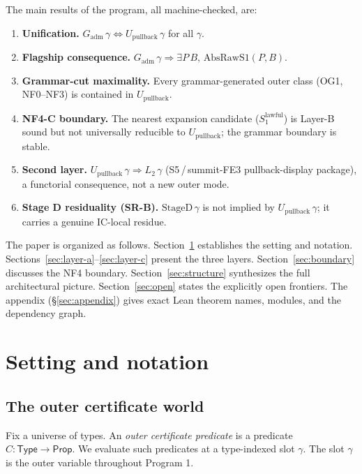 \documentclass[11pt]{article}
\theoremstyle{plain}
\theoremstyle{definition}
\newcommand{\Gadm}{G_{\mathrm{adm}}}
\newcommand{\Upb}{U_{\mathrm{pullback}}}
\newcommand{\AbsRawSone}{\mathrm{AbsRawS1}}
\newcommand{\Stwo}{L_2}
\newcommand{\StageD}{\mathrm{StageD}}
\newcommand{\SoneLawful}{S_1^{\mathrm{lawful}}}
\begin{document}
The main results of the program, all machine-checked, are:

\begin{enumerate}[label=(\Roman*)]
  \item \textbf{Unification.} $\Gadm\,\gamma \iff \Upb\,\gamma$ for all $\gamma$.
  \item \textbf{Flagship consequence.} $\Gadm\,\gamma \Rightarrow \exists P\,B,\, \AbsRawSone(P,B)$.
  \item \textbf{Grammar-cut maximality.} Every grammar-generated outer class
    (OG1, NF0--NF3) is contained in $\Upb$.
  \item \textbf{NF4-C boundary.} The nearest expansion candidate
    ($\SoneLawful$) is Layer-B sound but not universally reducible to $\Upb$;
    the grammar boundary is stable.
  \item \textbf{Second layer.} $\Upb\,\gamma \Rightarrow \Stwo\,\gamma$
    (S5\,/\,summit-FE3 pullback-display package), a functorial consequence,
    not a new outer mode.
  \item \textbf{Stage D residuality (SR-B).} $\StageD\,\gamma$ is not implied
    by $\Upb\,\gamma$; it carries a genuine IC-local residue.
\end{enumerate}

The paper is organized as follows.  Section~\ref{sec:background} establishes
the setting and notation.  Sections~\ref{sec:layer-a}--\ref{sec:layer-c}
present the three layers.  Section~\ref{sec:boundary} discusses the NF4
boundary.  Section~\ref{sec:structure} synthesizes the full architectural
picture.  Section~\ref{sec:open} states the explicitly open frontiers.
The appendix (\S\ref{sec:appendix}) gives exact Lean theorem names, modules,
and the dependency graph.

\section{Setting and notation}
\label{sec:background}

\subsection{The outer certificate world}

Fix a universe of types.  An \emph{outer certificate predicate} is a predicate
$C : \mathsf{Type} \to \mathsf{Prop}$.  We evaluate such predicates at a
type-indexed slot $\gamma$.  The slot $\gamma$ is the outer variable throughout
Program 1.
\end{document}
